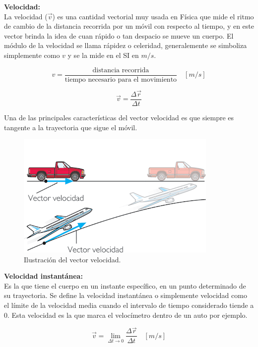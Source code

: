 \documentclass[a5paper,pagesize,10pt,bibtotoc,pointlessnumbers,
normalheadings,DIV=9,fleqn,x11names,table,twoside=false]{scrbook}
\begin{document}
\textbf{Velocidad:}\\

La velocidad ($\vec{v}$) es una cantidad vectorial muy usada en Física que mide el ritmo de cambio de la distancia recorrida por 
un móvil con respecto al tiempo, y en este vector brinda la idea de cuan rápido o tan despacio se mueve un cuerpo. El módulo de 
la velocidad se llama rápidez o celeridad, generalemente se simboliza simplemente como $v$ y se la mide en el SI en $m/s$. 

\begin{equation}
 v = \frac{\text{distancia recorrida}}{\text{tiempo necesario para el movimiento}} \quad [m/s]
\end{equation}

\begin{equation}
 \vec{v} = \frac{\Delta \vec{r}}{\Delta t}
\end{equation}

Una de las principales características del vector velocidad es que siempre es tangente a la trayectoria que sigue el móvil.

\begin{figure}[ht]
 \centering
 \includegraphics[scale=0.4]{images/vectorvelocidad.png}
 \caption{Ilustración del vector velocidad.}
\end{figure}

\textbf{Velocidad instantánea:}\\

 Es la que tiene el cuerpo en un instante específico, en un punto determinado de su trayectoria. Se define la velocidad 
instantánea o simplemente velocidad como el límite de la velocidad media cuando el intervalo de tiempo considerado tiende a 0. 
Esta velocidad es la que marca el velocímetro dentro de un auto por ejemplo.

 \begin{equation}
 \vec{v}=\lim_{\Delta t \to 0}\frac{\Delta \vec{r}}{\Delta t}\quad [m/s]
 \end{equation}
\end{document}
